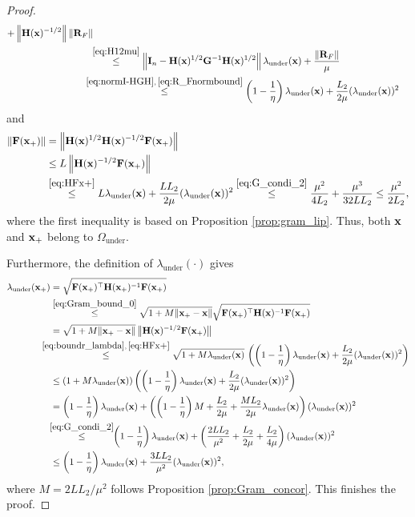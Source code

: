\documentclass[11pt]{article}
\theoremstyle{plain}
\theoremstyle{definition}
\theoremstyle{remark}
\theoremstyle{plain}
\newcommand{\Norm}[1]{\left\| #1 \right\|}
\newcommand{\R}{\mathbb{R}}
\def\F{{\bf F}}
\def\G{{\bf G}}
\def\H{{\bf H}}
\def\I{{\bf I}}
\def\R{{\bf R}}
\def\x{{\bf x}}
\begin{document}
\begin{proof}
\begin{align}
+\Norm{\H(\x)^{-1/2}}\|\R_F\|\notag\\
&\!\!\overset{\eqref{eq:H12mu}}\leq\Norm{\I_n-\H(\x)^{1/2}\G^{-1}\H(\x)^{1/2}}
\lambda_{\mathrm{under}}(\x)+\frac{\|\R_F\|}{\mu}\notag\\
&\!\!\!\!\!\!\overset{\eqref{eq:normI-HGH},\,\eqref{eq:R_Fnormbound}
}{\leq}\left(1-\frac{1}{\eta}\right)\lambda_{\mathrm{under}}(\x)
  +\frac{L_2}{2\mu}(\lambda_{\mathrm{under}}(\x))^2
\end{align}
and
\begin{align*}
\|\F(\x_{+})\|
&=\Norm{\H(\x)^{1/2}\H(\x)^{-1/2}\F(\x_{+})}\\
&\leq L\Norm{\H(\x)^{-1/2}\F(\x_{+})}\\
&\overset{\eqref{eq:HFx+}}{\leq}
L\lambda_{\mathrm{under}}(\x)
+\frac{LL_2}{2\mu}(\lambda_{\mathrm{under}}(\x))^2
\overset{\eqref{eq:G_condi_2}}{\leq}
\frac{\mu^2}{4L_2}+\frac{\mu^3}{32LL_2}
\leq\frac{\mu^2}{2L_2},
\end{align*}
where the first inequality is based on Proposition \ref{prop:gram_lip}.
Thus, both $\x$ and $\x_{+}$ belong to $\Omega_{\mathrm{under}}$.

Furthermore, the definition of $\lambda_{\mathrm{under}}(\cdot)$ gives
\begin{align*}
\lambda_{\mathrm{under}}(\x_{+})
&=\sqrt{\F(\x_{+})^{\top}\H(\x_{+})^{-1}\F(\x_{+})}\\
&\overset{\eqref{eq:Gram_bound_0}}{\leq}\sqrt{1+M\|\x_{+}-\x\|}
\sqrt{\F(\x_{+})^{\top}\H(\x)^{-1}\F(\x_{+})} \\
&=
\sqrt{1+M\|\x_{+}-\x\|} \,\big\|\H(\x)^{-1/2}\F(\x_{+})\big\|\\
&\!\!\!\!\!\!\!\overset{\eqref{eq:boundr_lambda},\,\eqref{eq:HFx+}}{\leq}
\sqrt{1+M\lambda_{\mathrm{under}}(\x)}\,
 \left(\left(1-\frac{1}{\eta}\right)\lambda_{\mathrm{under}}(\x)
 +\frac{L_2}{2\mu}(\lambda_{\mathrm{under}}(\x))^2\right)\\
&\leq(1+M\lambda_{\mathrm{under}}(\x))
 \left(\left(1-\frac{1}{\eta}\right)\lambda_{\mathrm{under}}(\x)
 +\frac{L_2}{2\mu}(\lambda_{\mathrm{under}}(\x))^2\right)\\
&=\left(1-\frac{1}{\eta}\right)\lambda_{\mathrm{under}}(\x)
+\left(\left(1-\frac{1}{\eta}\right)M+\frac{L_2}{2\mu}
+\frac{ML_2}{2\mu}\lambda_{\mathrm{under}}(\x)\right)
(\lambda_{\mathrm{under}}(\x))^2\\
&\!\!\overset{\eqref{eq:G_condi_2}}{\leq}\!\!
\left(1-\frac{1}{\eta}\right)\lambda_{\mathrm{under}}(\x)
+\left(\frac{2LL_2}{\mu^2}+\frac{L_2}{2\mu}
+\frac{L_2}{4\mu}\right)(\lambda_{\mathrm{under}}(\x))^2\\
&\leq\left(1-\frac{1}{\eta}\right)\lambda_{\mathrm{under}}(\x)
 +\frac{3LL_2}{\mu^2}(\lambda_{\mathrm{under}}(\x))^2,
\end{align*}
where $M=2LL_2/\mu^2$ follows Proposition \ref{prop:Gram_concor}.
This finishes the proof.
\end{proof}
\end{document}
